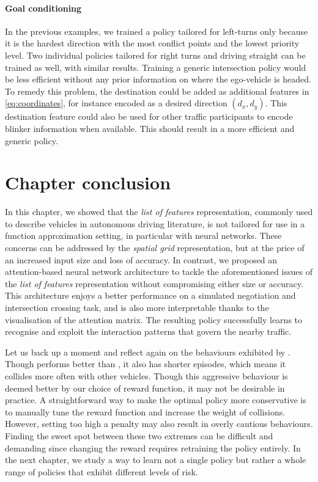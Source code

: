 \paragraph{Goal conditioning}

In the previous examples, we trained a policy tailored for left-turns only because it is the hardest direction with the most conflict points and the lowest priority level. Two individual policies tailored for right turns and driving straight can be trained as well, with similar results. Training a generic intersection policy would be less efficient without any prior information on where the ego-vehicle is headed. To remedy this problem, the destination could be added as additional features in \eqref{eq:coordinates}, for instance encoded as a desired direction $(d_x, d_y)$. This destination feature could also be used for other traffic participants to encode blinker information when available. This should result in a more efficient and generic policy.

\section*{Chapter conclusion}

In this chapter, we showed that the \emph{list of features} representation, commonly used to describe vehicles in autonomous driving literature, is not tailored for use in a function approximation setting, in particular with neural networks. These concerns can be addressed by the \emph{spatial grid} representation, but at the price of an increased input size and loss of accuracy. In contrast, we proposed an attention-based neural network architecture to tackle the aforementioned issues of the \emph{list of features} representation without compromising either size or accuracy. This architecture enjoys a better performance on a simulated negotiation and intersection crossing task, and is also more interpretable thanks to the visualisation of the attention matrix. The resulting policy successfully learns to recognise and exploit the interaction patterns that govern the nearby traffic.

Let us back up a moment and reflect again on the behaviours exhibited by . Though \EgoAtt performs better than \CNNG, it also has shorter episodes, which means it collides more often with other vehicles. Though this {aggressive} behaviour is deemed better by our choice of reward function, it may not be desirable in practice. A straightforward way to make the optimal policy more {conservative} is to manually tune the reward function and increase the weight of collisions. However, setting too high a penalty may also result in overly {cautious} behaviours. Finding the sweet spot between these two extremes can be difficult and demanding since changing the reward requires retraining the policy entirely. In the next chapter, we study a way to learn not a single policy but rather a whole range of policies that exhibit different levels of risk.

